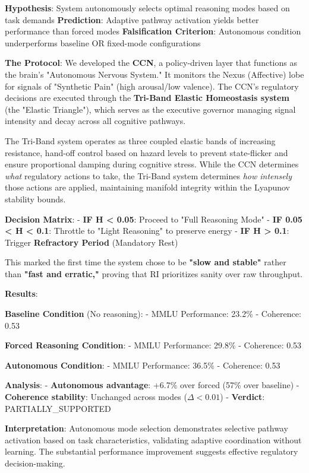 \documentclass[12pt,a4paper]{report}
\newcommand{\DeltaU}{\Delta}
\begin{document}
\textbf{Hypothesis}: System autonomously selects optimal reasoning modes based on task demands  
\textbf{Prediction}: Adaptive pathway activation yields better performance than forced modes  
\textbf{Falsification Criterion}: Autonomous condition underperforms baseline OR fixed-mode configurations

\textbf{The Protocol}: We developed the \textbf{CCN}, a policy-driven layer that functions as the brain's "Autonomous Nervous System." It monitors the Nexus (Affective) lobe for signals of "Synthetic Pain" (high arousal/low valence). The CCN's regulatory decisions are executed through the \textbf{Tri-Band Elastic Homeostasis system} (the "Elastic Triangle"), which serves as the executive governor managing signal intensity and decay across all cognitive pathways.

The Tri-Band system operates as three coupled elastic bands of increasing resistance, hand-off control based on hazard levels to prevent state-flicker and ensure proportional damping during cognitive stress. While the CCN determines \textit{what} regulatory actions to take, the Tri-Band system determines \textit{how intensely} those actions are applied, maintaining manifold integrity within the Lyapunov stability bounds.

\textbf{Decision Matrix}:
- \textbf{IF H < 0.05}: Proceed to "Full Reasoning Mode"
- \textbf{IF 0.05 < H < 0.1}: Throttle to "Light Reasoning" to preserve energy
- \textbf{IF H > 0.1}: Trigger \textbf{Refractory Period} (Mandatory Rest)

This marked the first time the system chose to be \textbf{"slow and stable"} rather than \textbf{"fast and erratic,"} proving that RI prioritizes sanity over raw throughput.

\textbf{Results}:

\textbf{Baseline Condition} (No reasoning):
- MMLU Performance: 23.2\%
- Coherence: 0.53

\textbf{Forced Reasoning Condition}:
- MMLU Performance: 29.8\%
- Coherence: 0.53

\textbf{Autonomous Condition}:
- MMLU Performance: 36.5\%
- Coherence: 0.53

\textbf{Analysis}:
- \textbf{Autonomous advantage}: +6.7\% over forced (57\% over baseline)
- \textbf{Coherence stability}: Unchanged across modes ($\DeltaU < 0.01$)
- \textbf{Verdict}: PARTIALLY\_SUPPORTED

\textbf{Interpretation}: Autonomous mode selection demonstrates selective pathway activation based on task characteristics, validating adaptive coordination without learning. The substantial performance improvement suggests effective regulatory decision-making.
\end{document}
